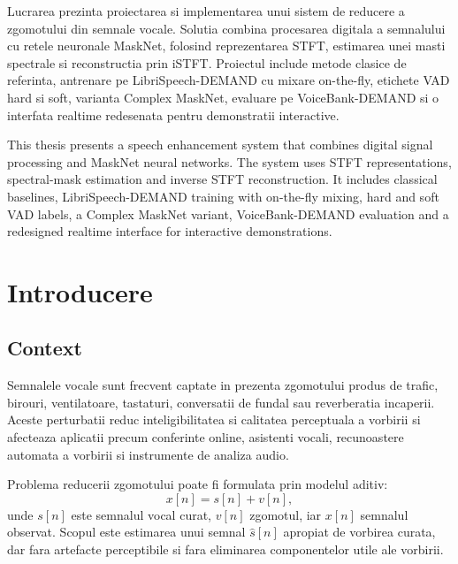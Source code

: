 \documentclass[12pt,a4paper]{report}
\newenvironment{abstractpage}
  {\clearpage\vspace*{\fill}\thispagestyle{empty}}
  {\vfill\clearpage}
\renewenvironment{abstract}[1]
  {\smallskip\selectlanguage{#1}%
   \begin{center}\bfseries\abstractname\end{center}\small}
  {\par\smallskip}
\begin{document}
\begin{abstractpage}
\begin{abstract}{romanian}
Lucrarea prezinta proiectarea si implementarea unui sistem de reducere a
zgomotului din semnale vocale. Solutia combina procesarea digitala a
semnalului cu retele neuronale MaskNet, folosind reprezentarea STFT, estimarea
unei masti spectrale si reconstructia prin iSTFT. Proiectul include metode
clasice de referinta, antrenare pe LibriSpeech-DEMAND cu mixare on-the-fly,
etichete VAD hard si soft, varianta Complex MaskNet, evaluare pe
VoiceBank-DEMAND si o interfata realtime redesenata pentru demonstratii
interactive.
\end{abstract}

\begin{abstract}{english}
This thesis presents a speech enhancement system that combines digital signal
processing and MaskNet neural networks. The system uses STFT representations,
spectral-mask estimation and inverse STFT reconstruction. It includes classical
baselines, LibriSpeech-DEMAND training with on-the-fly mixing, hard and soft VAD
labels, a Complex MaskNet variant, VoiceBank-DEMAND evaluation and a redesigned
realtime interface for interactive demonstrations.
\end{abstract}
\end{abstractpage}

\tableofcontents
\clearpage

\chapter{Introducere}

\section{Context}

Semnalele vocale sunt frecvent captate in prezenta zgomotului produs de trafic,
birouri, ventilatoare, tastaturi, conversatii de fundal sau reverberatia
incaperii. Aceste perturbatii reduc inteligibilitatea si calitatea perceptuala
a vorbirii si afecteaza aplicatii precum conferinte online, asistenti vocali,
recunoastere automata a vorbirii si instrumente de analiza audio.

Problema reducerii zgomotului poate fi formulata prin modelul aditiv:
\[
x[n] = s[n] + v[n],
\]
unde \(s[n]\) este semnalul vocal curat, \(v[n]\) zgomotul, iar \(x[n]\)
semnalul observat. Scopul este estimarea unui semnal \(\hat{s}[n]\) apropiat
de vorbirea curata, dar fara artefacte perceptibile si fara eliminarea
componentelor utile ale vorbirii.
\end{document}
